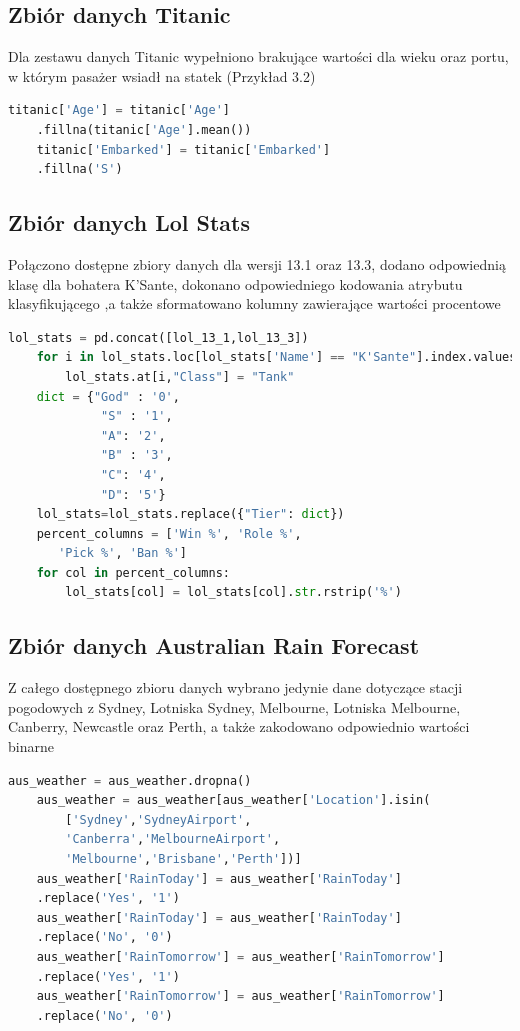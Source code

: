 \documentclass{book}
\begin{document}
\subsection{Zbiór danych Titanic}
Dla zestawu danych Titanic wypełniono 
brakujące wartości dla wieku oraz portu, w którym pasażer
wsiadł na statek (Przykład 3.2)
 \begin{lstlisting}[language=Python, caption={Przygotowanie zbioru danych Titanic do eksperymentów}, captionpos=b]
    titanic['Age'] = titanic['Age']
    .fillna(titanic['Age'].mean())
    titanic['Embarked'] = titanic['Embarked']
    .fillna('S')
\end{lstlisting}

\subsection{Zbiór danych Lol Stats}
Połączono dostępne zbiory danych dla wersji 13.1 oraz 13.3, 
dodano odpowiednią klasę dla bohatera K'Sante, dokonano 
odpowiedniego kodowania atrybutu klasyfikującego 
,a także sformatowano kolumny zawierające wartości procentowe
\begin{lstlisting}[language=Python, caption={Przygotowanie zbioru danych Lol Stats do eksperymentów}, captionpos=b]
    lol_stats = pd.concat([lol_13_1,lol_13_3])
    for i in lol_stats.loc[lol_stats['Name'] == "K'Sante"].index.values:
        lol_stats.at[i,"Class"] = "Tank"
    dict = {"God" : '0',
             "S" : '1',
             "A": '2',
             "B" : '3',
             "C": '4',
             "D": '5'}
    lol_stats=lol_stats.replace({"Tier": dict})
    percent_columns = ['Win %', 'Role %',
       'Pick %', 'Ban %']
    for col in percent_columns:
        lol_stats[col] = lol_stats[col].str.rstrip('%')
\end{lstlisting}

\subsection{Zbiór danych Australian Rain Forecast}
Z całego dostępnego zbioru danych wybrano jedynie dane dotyczące stacji pogodowych z Sydney, Lotniska Sydney, Melbourne, 
Lotniska Melbourne, Canberry, Newcastle oraz Perth, a także zakodowano odpowiednio wartości binarne

\begin{lstlisting}[language=Python, caption={Przygotowanie zbioru danych Australian Rain Forecast do eksperymentów}, captionpos=b]
    aus_weather = aus_weather.dropna()
    aus_weather = aus_weather[aus_weather['Location'].isin(
        ['Sydney','SydneyAirport',
        'Canberra','MelbourneAirport',
        'Melbourne','Brisbane','Perth'])]
    aus_weather['RainToday'] = aus_weather['RainToday']
    .replace('Yes', '1')
    aus_weather['RainToday'] = aus_weather['RainToday']
    .replace('No', '0')
    aus_weather['RainTomorrow'] = aus_weather['RainTomorrow']
    .replace('Yes', '1')
    aus_weather['RainTomorrow'] = aus_weather['RainTomorrow']
    .replace('No', '0')
\end{lstlisting}
\end{document}
